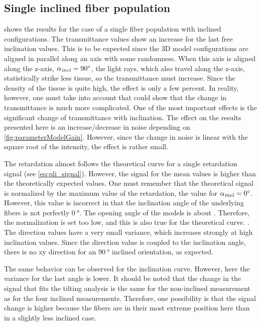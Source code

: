 \subsection{Single inclined fiber population}
 shows the results for the case of a single fiber population with inclined configurations.
The transmittance values show an increase for the last free inclination values.
This is to be expected since the 3D model configurations are aligned in parallel along an axis with some randomness.
When this axis is aligned along the z-axis, \ie{} $\textnormal{$\alpha_{\mathit{incl}}$}=\SI{90}{\degree}$, the light rays, which also travel along the z-axis, statistically strike less tissue, so the transmittance must increase.
Since the density of the tissue is quite high, the effect is only a few percent.
In reality, however, one must take into account that \cite{Menzel2021} could show that the change in transmittance is much more complicated.
One of the most important effects is the significant change of transmittance with inclination.
The effect on the results presented here is an increase/decrease in noise depending on \cref{fig:parameterModelGain}.
However, since the change in noise is linear with the square root of the intensity, the effect is rather small.
\par
%
The retardation almost follows the theoretical curve for a single retardation signal (see \cref{eq:pli_signal}).
However, the signal for the mean values is higher than the theoretically expected values.
One must remember that the theoretical signal is normalized by the maximum value of the retardation, \ie{} the value for $\textnormal{$\alpha_{\mathit{incl}}$} = \SI{0}{\degree}$.
However, this value is incorrect in that the inclination angle of the underlying fibers is not perfectly $\SI{0}{\degree}$. The opening angle of the models is about \dummy{}.
Therefore, the normalization is set too low, and this is also true for the theoretical curve.
\dummy{}.
%
The direction values have a very small variance, which increases strongly at high inclination values.
Since the direction value is coupled to the inclination angle, there is no xy direction for an $\SI{90}{\degree}$ inclined orientation, as expected.
\par
%
The same behavior can be observed for the inclination curve.
However, here the variance for the last angle is lower.
It should be noted that the change in the signal that fits the tilting analysis is the same for the non-inclined measurement as for the four inclined measurements.
Therefore, one possibility is that the signal change is higher because the fibers are in their most extreme position here than in a slightly less inclined case.
